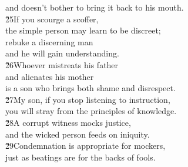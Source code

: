 \begin{poetry}
\poemll    and doesn't bother to bring it back to his mouth. \\
\poeml \v{25}If you scourge a scoffer, \\
\poemll    the simple person may learn to be discreet; \\
\poeml rebuke a discerning man \\
\poemll    and he will gain understanding. \\
\poeml \v{26}Whoever mistreats his father \\
\poemll    and alienates his mother \\
\poemlll       is a son who brings both shame and disrespect. \\
\poeml \v{27}My son, if you stop listening to instruction, \\
\poemll    you will stray from the principles of knowledge. \\
\poeml \v{28}A corrupt witness mocks justice, \\
\poemll    and the wicked person feeds on iniquity. \\
\poeml \v{29}Condemnation is appropriate for mockers, \\
\poemll    just as beatings are for the backs of fools.
\end{poetry}

